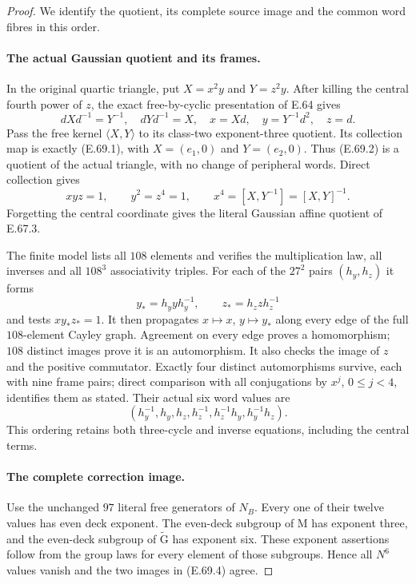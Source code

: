 \begin{proof}
We identify the quotient, its complete source image and
the common word fibres in this order.

\paragraph{The actual Gaussian quotient and its frames.}
In the original quartic triangle, put
$X=x^2y$ and $Y=z^2y$. After killing the central fourth
power of $z$, the exact free-by-cyclic presentation of
E.64 gives
\[
 dXd^{-1}=Y^{-1},\quad dYd^{-1}=X,\quad
 x=Xd,\quad y=Y^{-1}d^2,\quad z=d.
 \tag{E.69.9}
\]
Pass the free kernel $\langle X,Y\rangle$ to its
class-two exponent-three quotient. Its collection map
is exactly (E.69.1), with $X=(e_1,0)$ and
$Y=(e_2,0)$. Thus (E.69.2) is a quotient of the actual
triangle, with no change of peripheral words. Direct
collection gives
\[
 xyz=1,\qquad y^2=z^4=1,\qquad
 x^4=[X,Y^{-1}]=[X,Y]^{-1}.
 \tag{E.69.10}
\]
Forgetting the central coordinate gives the literal
Gaussian affine quotient of E.67.3.

The finite model lists all $108$ elements and verifies
the multiplication law, all inverses and all
$108^3$ associativity triples. For each of the
$27^2$ pairs $(h_y,h_z)$ it forms
\[
 y_*=h_y y h_y^{-1},\qquad z_*=h_z z h_z^{-1}
 \tag{E.69.11}
\]
and tests $xy_*z_*=1$. It then propagates
$x\mapsto x$, $y\mapsto y_*$ along every edge of the
full $108$-element Cayley graph. Agreement on every
edge proves a homomorphism; $108$ distinct images
prove it is an automorphism. It also checks the image
of $z$ and the positive commutator. Exactly four
distinct automorphisms survive, each with nine frame
pairs; direct comparison with all conjugations by
$x^j$, $0\leq j<4$, identifies them as stated.
Their actual six word values are
\[
 (h_y^{-1},h_y,h_z,h_z^{-1},h_z^{-1}h_y,h_y^{-1}h_z).
 \tag{E.69.12}
\]
This ordering retains both three-cycle and inverse
equations, including the central terms.

\paragraph{The complete correction image.}
Use the unchanged $97$ literal free generators of
$N_B$. Every one of their twelve values has even
deck exponent. The even-deck subgroup of $\mathrm M$
has exponent three, and the even-deck subgroup of
$\widetilde{\mathrm G}$ has exponent six. These
exponent assertions follow from the group laws for
every element of those subgroups. Hence all $N^6$
values vanish and the two images in (E.69.4) agree.


\end{proof}
